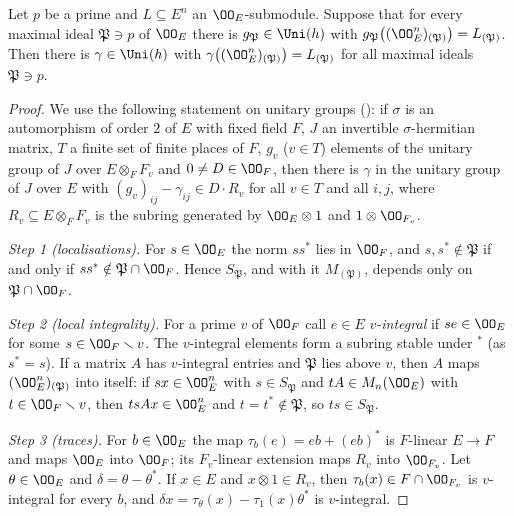\begin{proposition}\label{pf:rows:wa}
Let $p$ be a prime and $L\subseteq E^n$ an $\OO_E$-submodule. Suppose that for every maximal ideal $\mathfrak P\ni p$ of $\OO_E$
there is $g_{\mathfrak P}\in\Uni(h)$ with $g_{\mathfrak P}\bigl((\OO_E^n)_{(\mathfrak P)}\bigr)=L_{(\mathfrak P)}$. Then there is
$\gamma\in\Uni(h)$ with $\gamma\bigl((\OO_E^n)_{(\mathfrak P)}\bigr)=L_{(\mathfrak P)}$ for all maximal ideals $\mathfrak P\ni p$.
\end{proposition}

\begin{proof}
We use the following statement on unitary groups (): if $\sigma$ is an
automorphism of order $2$ of $E$ with fixed field $F$, $J$ an invertible $\sigma$-hermitian matrix, $T$ a finite set of
finite places of $F$, $g_v$ ($v\in T$) elements of the unitary group of $J$ over $E\otimes_FF_v$ and $0\ne D\in\OO_F$, then
there is $\gamma$ in the unitary group of $J$ over $E$ with $(g_v)_{ij}-\gamma_{ij}\in D\cdot R_v$ for all $v\in T$ and all
$i,j$, where $R_v\subseteq E\otimes_FF_v$ is the subring generated by $\OO_E\otimes1$ and $1\otimes\OO_{F_v}$.

\emph{Step 1 (localisations).} For $s\in\OO_E$ the norm $ss^*$ lies in $\OO_F$, and $s,s^*\notin\mathfrak P$ if and only if
$ss^*\notin\mathfrak P\cap\OO_F$. Hence $S_{\mathfrak P}$, and with it $M_{(\mathfrak P)}$, depends only on $\mathfrak P\cap\OO_F$.

\emph{Step 2 (local integrality).} For a prime $v$ of $\OO_F$ call $e\in E$ \emph{$v$-integral} if $se\in\OO_E$ for some
$s\in\OO_F\smallsetminus v$. The $v$-integral elements form a subring stable under ${}^*$ (as $s^*=s$). If a matrix $A$
has $v$-integral entries and $\mathfrak P$ lies above $v$, then $A$ maps $(\OO_E^n)_{(\mathfrak P)}$ into itself: if $sx\in\OO_E^n$
with $s\in S_{\mathfrak P}$ and $tA\in M_n(\OO_E)$ with $t\in\OO_F\smallsetminus v$, then $tsAx\in\OO_E^n$ and
$t=t^*\notin\mathfrak P$, so $ts\in S_{\mathfrak P}$.

\emph{Step 3 (traces).} For $b\in\OO_E$ the map $\tau_b(e)=eb+(eb)^*$ is $F$-linear $E\to F$ and maps $\OO_E$ into $\OO_F$;
its $F_v$-linear extension maps $R_v$ into $\OO_{F_v}$. Let $\theta\in\OO_E$ and $\delta=\theta-\theta^*$. If $x\in E$ and
$x\otimes1\in R_v$, then $\tau_b(x)\in F\cap\OO_{F_v}$ is $v$-integral for every $b$, and
$\delta x=\tau_\theta(x)-\tau_1(x)\theta^*$ is $v$-integral.


\end{proof}
